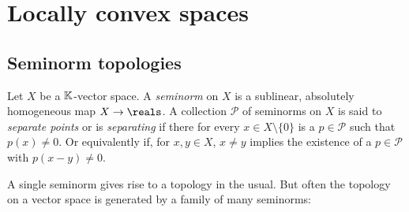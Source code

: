 \documentclass[article, a4paper, 11pt, oneside]{memoir}
\numberwithin{equation}{chapter}
\newcommand{\calP}{\mathcal{P}}
\begin{document}


\chapter{Locally convex spaces}

\section{Seminorm topologies}

Let $X$ be a $\mathbb{K}$-vector space. A \emph{seminorm} on $X$ is a sublinear, absolutely homogeneous map $X \to \reals$. A collection $\calP$ of seminorms on $X$ is said to \emph{separate points} or is \emph{separating} if there for every $x \in X \setminus \{0\}$ is a $p \in \calP$ such that $p(x) \neq 0$. Or equivalently if, for $x,y \in X$, $x \neq y$ implies the existence of a $p \in \calP$ with $p(x-y) \neq 0$.

A single seminorm gives rise to a topology in the usual. But often the topology on a vector space is generated by a family of many seminorms:
\end{document}
